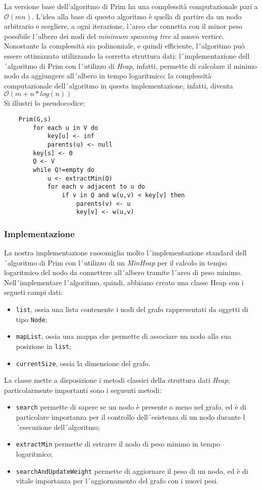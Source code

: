 La versione base dell'algoritmo di Prim ha una complessità computazionale
pari a $\mathcal{O}(mn)$. L'idea alla base di questo algoritmo è quella di partire da un
nodo arbitrario e scegliere, a ogni iterazione, l´arco che connetta con il minor peso possibile
l´albero dei nodi del \textit{minimum spanning tree} al nuovo vertice. \\
Nonostante la complessità sia polinomiale, e quindi efficiente, l´algoritmo può essere ottimizzato
utilizzando la corretta struttura dati: l´implementazione dell´algoritmo di Prim con l´utilizzo di
\textit{Heap}, infatti, permette di calcolare il minimo nodo da aggiungere all´albero in tempo logaritmico;
la complessità computazionale dell´algoritmo in questa implementazione, infatti, diventa $\mathcal{O}(m+n*log(n))$ \\
Si illustri lo pseudocodice:
\newpage
\begin{verbatim}
    Prim(G,s)
        for each u in V do
            key[u] <- inf
            parents(u) <- null
        key[s] <- 0
        Q <- V
        while Q!=empty do
            u <- extractMin(Q)
            for each v adjacent to u do
                if v in Q and w(u,v) < key[v] then
                    parents(v) <- u
                    key[v] <- w(u,v)
\end{verbatim}

\subsubsection{Implementazione}
La nostra implementazione rassomiglia molto l´implementazione standard dell´algoritmo di Prim
con l´utilizzo di un \textit{MinHeap} per il calcolo in tempo logaritmico del nodo da connettere all´albero
tramite l´arco di peso minimo. \\
Nell´implementare l´algoritmo, quindi, abbiamo creato una classe Heap con i segueti campi dati:
\begin{itemize}
    \item \texttt{list}, ossia una lista contenente i nodi del grafo rappresentati da oggetti di tipo \texttt{Node};
    \item \texttt{mapList}, ossia una mappa che permette di associare un nodo alla sua posizione in \texttt{list};
    \item \texttt{currentSize}, ossia la dimensione del grafo.
\end{itemize}
La classe mette a disposizione i metodi classici della struttura dati \textit{Heap}; particolarmente importanti sono
i seguenti metodi:
\begin{itemize}
    \item \texttt{search} permette di sapere se un nodo è presente o meno nel grafo, ed è di particolare importanza
    per il controllo dell´esistenza di un nodo durante l´esecuzione dell´algoritmo;
    \item \texttt{extractMin} permette di estrarre il nodo di peso minimo in tempo logaritmico;
    \item \texttt{searchAndUpdateWeight} permette di aggiornare il peso di un nodo, ed è di vitale importanza
    per l´aggiornamento del grafo con i nuovi pesi.
\end{itemize}

